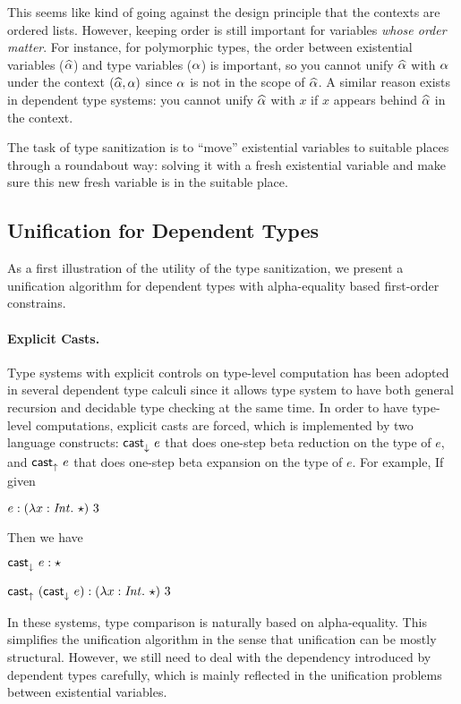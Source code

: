This seems like kind of going against the design principle that the
contexts are ordered lists. However, keeping order is still important for
variables \textit{whose order matter}. For instance, for polymorphic types, the
order between existential variables ($\widehat{\alpha}$) and type variables ($\alpha$) is
important, so you cannot unify $\widehat{\alpha}$ with $\alpha$ under the context $(\widehat{\alpha},
\alpha)$ since $\alpha$ is not in the scope of $\widehat{\alpha}$. A similar reason exists in
dependent type systems: you cannot unify $\widehat{\alpha}$ with $x$ if $x$ appears behind
$\widehat{\alpha}$ in the context.

The task of type sanitization is to ``move'' existential variables to suitable
places through a roundabout way: solving it with a fresh existential variable
and make sure this new fresh variable is in the suitable place.

\subsection{Unification for Dependent Types}

As a first illustration of the utility of the type sanitization, we present a
unification algorithm for dependent types with alpha-equality based
first-order constrains.

\paragraph{Explicit Casts.}

Type systems with explicit controls on type-level computation has been adopted
in several dependent type calculi \cite{???} since it allows type system to have
both general recursion and decidable type checking at the same time. In order to
have type-level computations, explicit casts are forced, which is implemented by
two language constructs: $\mathsf{cast}_\downarrow^{}~ e$ that does one-step beta reduction on the
type of $e$, and $\mathsf{cast}_\uparrow^{}~ e$ that does one-step beta expansion on the type of
$e$. For example, If given

$e: (\lambda x:\mathit{Int}.~ \star) ~ 3$

\noindent Then we have

$\mathsf{cast}_\downarrow^{}~ e : \star$

$\mathsf{cast}_\uparrow^{}~ (\mathsf{cast}_\downarrow^{}~ e) : (\lambda x:\mathit{Int}.~ \star) ~ 3$

In these systems, type comparison is naturally based on alpha-equality. This
simplifies the unification algorithm in the sense that unification can be mostly
structural. However, we still need to deal with the dependency introduced by
dependent types carefully, which is mainly reflected in the unification problems
between existential variables.

